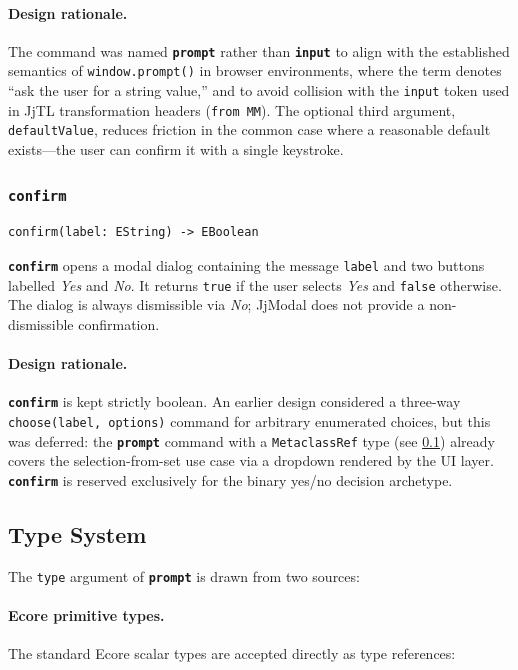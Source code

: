 \documentclass[11pt,a4paper]{article}
\newcommand{\jjmodal}{\textsf{JjModal}}
\newcommand{\jjtl}{\textsf{JjTL}}
\newcommand{\kw}[1]{\texttt{\textbf{#1}}}
\begin{document}
\paragraph{Design rationale.} The command was named \kw{prompt} rather
than \kw{input} to align with the established semantics of
\texttt{window.prompt()} in browser environments, where the term denotes
``ask the user for a string value,'' and to avoid collision with the
\texttt{input} token used in \jjtl{} transformation headers (\texttt{from
MM}). The optional third argument, \texttt{defaultValue}, reduces friction
in the common case where a reasonable default exists---the user can
confirm it with a single keystroke.
 
\subsubsection{\texttt{confirm}}
 
\begin{lstlisting}[style=jjmodal,numbers=none]
confirm(label: EString) -> EBoolean
\end{lstlisting}
 
\kw{confirm} opens a modal dialog containing the message \texttt{label}
and two buttons labelled \emph{Yes} and \emph{No}. It returns
\texttt{true} if the user selects \emph{Yes} and \texttt{false}
otherwise. The dialog is always dismissible via \emph{No}; \jjmodal{}
does not provide a non-dismissible confirmation.
 
\paragraph{Design rationale.} \kw{confirm} is kept strictly boolean. An
earlier design considered a three-way \texttt{choose(label, options)}
command for arbitrary enumerated choices, but this was deferred: the
\kw{prompt} command with a \texttt{MetaclassRef} type (see
\cref{sec:jjmodal-types}) already covers the selection-from-set use case
via a dropdown rendered by the UI layer. \kw{confirm} is reserved
exclusively for the binary yes/no decision archetype.
 
\subsection{Type System}\label{sec:jjmodal-types}
 
The \texttt{type} argument of \kw{prompt} is drawn from two sources:
 
\paragraph{Ecore primitive types.} The standard Ecore scalar types are
accepted directly as type references:
 
\end{document}
